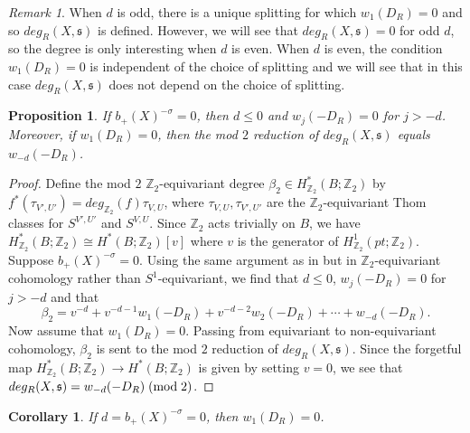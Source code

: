 \documentclass{amsart}
\newtheorem{corollary}[theorem]{Corollary}
\newtheorem{proposition}[theorem]{Proposition}
\theoremstyle{definition}
\theoremstyle{remark}
\newtheorem{remark}[theorem]{Remark}
\numberwithin{equation}{section}
\begin{document}
\begin{remark}
When $d$ is odd, there is a unique splitting for which $w_1(D_R) = 0$ and so $deg_R(X,\mathfrak{s})$ is defined. However, we will see that $deg_R(X,\mathfrak{s}) = 0$ for odd $d$, so the degree is only interesting when $d$ is even. When $d$ is even, the condition $w_1(D_R) = 0$ is independent of the choice of splitting and we will see that in this case $deg_R(X,\mathfrak{s})$ does not depend on the choice of splitting.
\end{remark}

\begin{proposition}\label{prop:mod2deg}
If $b_+(X)^{-\sigma} = 0$, then $d \le 0$ and $w_{j}(-D_R) = 0$ for $j > -d$. Moreover, if $w_1(D_R) = 0$, then the mod $2$ reduction of $deg_R(X,\mathfrak{s})$ equals $w_{-d}(-D_R)$.
\end{proposition}
\begin{proof}
Define the mod $2$ $\mathbb{Z}_2$-equivariant degree $\beta_2 \in H^*_{\mathbb{Z}_2}( B ; \mathbb{Z}_2)$ by $f^*( \tau_{V',U'} ) = deg_{\mathbb{Z}_2}(f) \tau_{V,U}$, where $\tau_{V,U}, \tau_{V',U'}$ are the $\mathbb{Z}_2$-equivariant Thom classes for $S^{V',U'}$ and $S^{V,U}$. Since $\mathbb{Z}_2$ acts trivially on $B$, we have $H^*_{\mathbb{Z}_2}(B ; \mathbb{Z}_2) \cong H^*(B ; \mathbb{Z}_2)[v]$ where $v$ is the generator of $H^1_{\mathbb{Z}_2}(pt ; \mathbb{Z}_2)$. Suppose $b_+(X)^{-\sigma} = 0$. Using the same argument as in \cite[]{bar} but in $\mathbb{Z}_2$-equivariant cohomology rather than $S^1$-equivariant, we find that $d \le 0$, $w_j(-D_R) = 0$ for $j > -d$ and that
\[
\beta_2 = v^{-d} + v^{-d-1} w_1(-D_R) + v^{-d-2} w_2(-D_R) + \cdots + w_{-d}(-D_R).
\]
Now assume that $w_1(D_R) = 0$. Passing from equivariant to non-equivariant cohomology, $\beta_2$ is sent to the mod $2$ reduction of $deg_R(X,\mathfrak{s})$. Since the forgetful map $H^*_{\mathbb{Z}_2}(B ; \mathbb{Z}_2) \to H^*(B ; \mathbb{Z}_2)$ is given by setting $v=0$, we see that $deg_R(X,\mathfrak{s}) = w_{-d}(-D_R) \; ({\rm mod} \; 2)$.
\end{proof}

\begin{corollary}
If $d = b_+(X)^{-\sigma} = 0$, then $w_1(D_R) = 0$.
\end{corollary}
\end{document}
